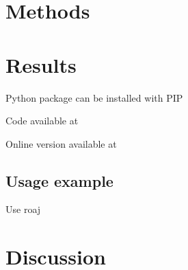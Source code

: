 \section{Methods}



\section{Results}

Python package can be installed with PIP

Code available at

Online version available at


\subsection{Usage example}

Use roaj


\section{Discussion}

\onehalfspacing %

